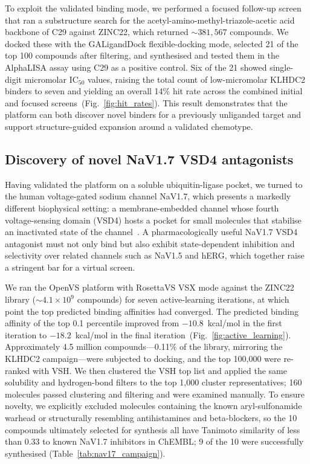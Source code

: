 \documentclass[11pt]{article}
\begin{document}
To exploit the validated binding mode, we performed a focused follow-up
screen that ran a substructure search for the
acetyl-amino-methyl-triazole-acetic acid backbone of C29 against ZINC22,
which returned $\sim 381{,}567$ compounds. We docked these with the
GALigandDock flexible-docking mode, selected 21 of the top 100 compounds
after filtering, and synthesised and tested them in the AlphaLISA assay
using C29 as a positive control. Six of the 21 showed single-digit
micromolar IC$_{50}$ values, raising the total count of low-micromolar
KLHDC2 binders to seven and yielding an overall 14\% hit rate across
the combined initial and focused screens~(Fig.~\ref{fig:hit_rates}).
This result demonstrates that the platform can both discover novel
binders for a previously unliganded target and support structure-guided
expansion around a validated chemotype.

\subsection{Discovery of novel NaV1.7 VSD4 antagonists}

Having validated the platform on a soluble ubiquitin-ligase pocket, we
turned to the human voltage-gated sodium channel NaV1.7, which presents
a markedly different biophysical setting: a membrane-embedded channel
whose fourth voltage-sensing domain (VSD4) hosts a pocket for small
molecules that stabilise an inactivated state of the
channel~\citep{wang2015nav17methyl}. A pharmacologically useful
NaV1.7 VSD4 antagonist must not only bind but also exhibit state-dependent
inhibition and selectivity over related channels such as NaV1.5 and hERG,
which together raise a stringent bar for a virtual screen.

We ran the OpenVS platform with RosettaVS VSX mode against the ZINC22
library ($\sim 4.1 \times 10^9$ compounds) for seven active-learning
iterations, at which point the top predicted binding affinities had
converged. The predicted binding affinity of the top 0.1 percentile
improved from $-10.8$~kcal/mol in the first iteration to $-18.2$~kcal/mol
in the final iteration~(Fig.~\ref{fig:active_learning}). Approximately
4.5 million compounds---0.11\% of the library, mirroring the KLHDC2
campaign---were subjected to docking, and the top 100{,}000 were
re-ranked with VSH. We then clustered the VSH top list and applied the
same solubility and hydrogen-bond filters to the top 1{,}000 cluster
representatives; 160 molecules passed clustering and filtering and were
examined manually. To ensure novelty, we explicitly excluded molecules
containing the known aryl-sulfonamide warhead or structurally resembling
antihistamines and beta-blockers, so the 10 compounds ultimately
selected for synthesis all have Tanimoto similarity of less than 0.33 to
known NaV1.7 inhibitors in ChEMBL; 9 of the 10 were successfully
synthesised (Table~\ref{tab:nav17_campaign}).
\end{document}

